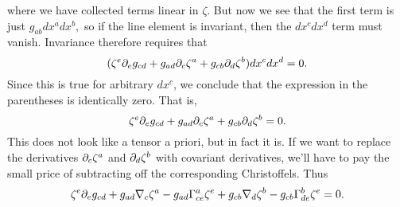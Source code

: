where we have collected terms linear in $\zeta$. But now we see that the first term is just $g_{ab} dx^a dx^b,$ so if the line element is invariant, then the $dx^c dx^d$ term must vanish. Invariance therefore requires that
$$(\zeta^e \partial_e g_{cd} + g_{ad} \partial_c \zeta^a +g_{cb} \partial_d \zeta^b)dx^c dx^d=0.$$
Since this is true for arbitrary $dx^c$, we conclude that the expression in the parentheses is identically zero. That is,
$$\zeta^e \partial_e g_{cd} + g_{ad} \partial_c \zeta^a +g_{cb} \partial_d \zeta^b=0.$$
This does not look like a tensor a priori, but in fact it is. If we want to replace the derivatives $\partial_c \zeta^a$ and $\partial_d \zeta^b$ with covariant derivatives, we'll have to pay the small price of subtracting off the corresponding Christoffels. Thus
$$\zeta^e \partial_e g_{cd} + g_{ad} \nabla_c \zeta^a - g_{ad}\Gamma^a_{ce} \zeta^e+g_{cb} \nabla_d \zeta^b - g_{cb} \Gamma^b_{de}\zeta^e=0.$$

